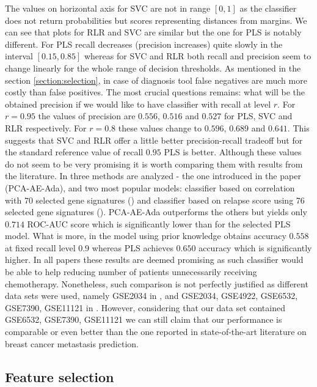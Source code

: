\documentclass[shortabstract, english, mgr]{iithesis}
\begin{document}
The values on horizontal axis for SVC are not in range $[0, 1]$ as the classifier does not return probabilities but scores representing distances from margins. We can see that plots for RLR and SVC are similar but the one for PLS is notably different. For PLS recall decreases (precision increases) quite slowly in the interval $[0.15, 0.85]$ whereas for SVC and RLR both recall and precision seem to change linearly for the whole range of decision thresholds. As mentioned in the section \ref{section:selection}, in case of diagnosis tool false negatives are much more costly than false positives. The most crucial questions remains: what will be the obtained precision if we would like to have classifier with recall at level $r$. For $r=0.95$ the values of precision are $0.556$, $0.516$ and $0.527$ for PLS, SVC and RLR respectively. For $r=0.8$ these values change to $0.596$, $0.689$ and $0.641$. This suggests that SVC and RLR offer a little better precision-recall tradeoff but for the standard reference value of recall $0.95$ PLS is better. Although these values do not seem to be very promising it is worth comparing them with results from the literature. In \cite{MetastasisComparison} three methods are analyzed - the one introduced in the paper (PCA-AE-Ada), and two most popular models: classifier based on correlation with $70$ selected gene signatures (\cite{Metastasis1}) and classifier based on relapse score using 76 selected gene signatures (\cite{metastasis76}). PCA-AE-Ada outperforms the others but yields only $0.714$ ROC-AUC score which is significantly lower than for the selected PLS model. What is more, in \cite{MetastasisScores} the model using prior knowledge obtains accuracy $0.558$ at fixed recall level $0.9$ whereas PLS achieves $0.650$ accuracy which is significantly higher. In all papers these results are deemed promising as such classifier would be able to help reducing number of patients unnecessarily receiving chemotherapy. Nonetheless, such comparison is not perfectly justified as different data sets were used, namely GSE2034 in \cite{MetastasisScores}, \cite{metastasis76} and GSE2034, GSE4922, GSE6532, GSE7390, GSE11121 in \cite{MetastasisComparison}. However, considering that our data set contained GSE6532, GSE7390, GSE11121 we can still claim that our performance is comparable or even better than the one reported in state-of-the-art literature on breast cancer metastasis prediction.


\subsection{Feature selection}
\end{document}
